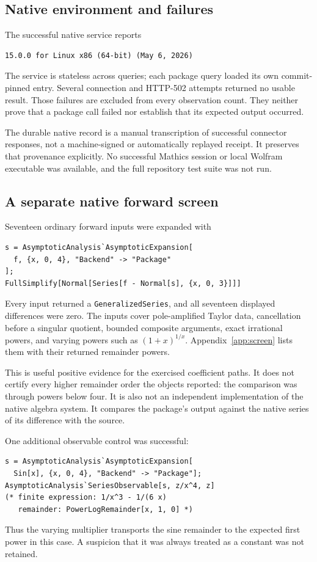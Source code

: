 \documentclass[11pt,letterpaper]{article}
\theoremstyle{remark}\newtheorem{remark}[theorem]{Remark}
\newcommand{\code}[1]{\texttt{#1}}
\begin{document}
\subsection{Native environment and failures}
The successful native service reports
\begin{lstlisting}
15.0.0 for Linux x86 (64-bit) (May 6, 2026)
\end{lstlisting}
The service is stateless across queries; each package query loaded its own
commit-pinned entry. Several connection and HTTP-502 attempts returned no usable
result. Those failures are excluded from every observation count. They neither
prove that a package call failed nor establish that its expected output occurred.

The durable native record is a manual transcription of successful connector
responses, not a machine-signed or automatically replayed receipt. It preserves
that provenance explicitly. No successful Mathics session or local Wolfram
executable was available, and the full repository test suite was not run.

\subsection{A separate native forward screen}
Seventeen ordinary forward inputs were expanded with
\begin{lstlisting}
s = AsymptoticAnalysis`AsymptoticExpansion[
  f, {x, 0, 4}, "Backend" -> "Package"
];
FullSimplify[Normal[Series[f - Normal[s], {x, 0, 3}]]]
\end{lstlisting}
Every input returned a \code{GeneralizedSeries}, and all seventeen displayed
differences were zero. The inputs cover pole-amplified Taylor data,
cancellation before a singular quotient, bounded composite arguments, exact
irrational powers, and varying powers such as $(1+x)^{1/x}$. Appendix~\ref{app:screen}
lists them with their returned remainder powers.

This is useful positive evidence for the exercised coefficient paths. It does
not certify every higher remainder order the objects reported: the comparison
was through powers below four. It is also not an independent implementation
of the native algebra system. It compares the package's output against the
native series of its difference with the source.

One additional observable control was successful:
\begin{lstlisting}
s = AsymptoticAnalysis`AsymptoticExpansion[
  Sin[x], {x, 0, 4}, "Backend" -> "Package"];
AsymptoticAnalysis`SeriesObservable[s, z/x^4, z]
(* finite expression: 1/x^3 - 1/(6 x)
   remainder: PowerLogRemainder[x, 1, 0] *)
\end{lstlisting}
Thus the varying multiplier transports the sine remainder to the expected
first power in this case. A suspicion that it was always treated as a constant
was not retained.
\end{document}
